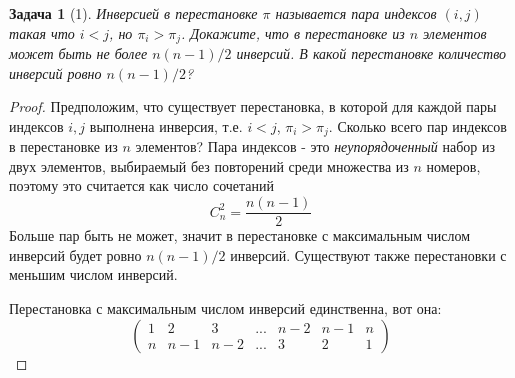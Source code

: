 \documentclass[12pt]{extarticle}
\newtheorem*{problem}{Задача}
\begin{document}
\begin{problem}[1]
{\em Инверсией} в перестановке $\pi$ называется пара индексов $(i,j)$ такая что $i<j$, но $\pi_i>\pi_j$. Докажите, что в перестановке из $n$ элементов может быть не более $n(n-1)/2$ инверсий. В какой перестановке количество инверсий ровно $n(n-1)/2$?
\end{problem}

\begin{proof}

Предположим, что существует перестановка, в которой для каждой пары индексов $i, j$ выполнена инверсия, т.е. $i<j$, $\pi_i>\pi_j$.
Сколько всего пар индексов в перестановке из $n$ элементов? Пара индексов - это {\em неупорядоченный} набор из двух элементов, выбираемый без повторений среди множества из $n$ номеров, поэтому это считается как число сочетаний $$C_n^2 = \frac{n(n-1)}{2}$$Больше пар быть не может, значит в перестановке с максимальным числом инверсий будет ровно $n(n-1)/2$ инверсий. Существуют также перестановки с меньшим числом инверсий. 

Перестановка с максимальным числом инверсий единственна, вот она:
$$
\begin{pmatrix}
    1 & 2 & 3 & ... & n-2 & n-1 & n \\
    n & n-1 & n-2 & ... & 3 & 2 & 1
\end{pmatrix}
$$



\end{proof}
\end{document}
